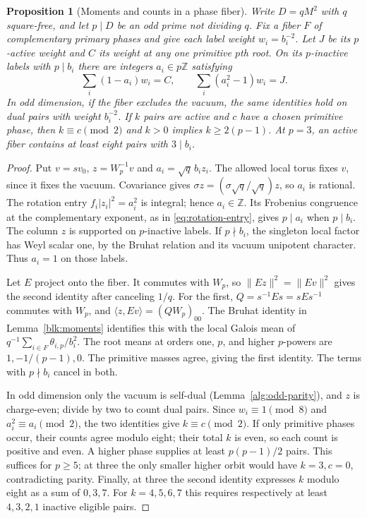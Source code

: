 \documentclass[11pt]{amsart}
\numberwithin{equation}{section}
\newtheorem{proposition}[theorem]{Proposition}
\theoremstyle{definition}
\theoremstyle{plain}
\begin{document}
\begin{proposition}[Moments and counts in a phase fiber]\label{phase:moments}\label{odd:edge-budget}
Write $D=qM^2$ with $q$ square-free, and let $p\mid D$ be an odd
prime not dividing $q$. Fix a fiber $F$ of complementary primary phases and
give each label weight $w_i=b_i^{-2}$. Let $J$ be its $p$-active
weight and $C$ its weight at any one primitive $p$th root.
On its $p$-inactive labels with $p\mid b_i$ there are integers
$a_i\in p\mathbb Z$ satisfying
\[
       \sum_i(1-a_i)w_i=C,\qquad
       \sum_i(a_i^2-1)w_i=J.
\]
In odd dimension, if the fiber excludes the vacuum, the same
identities hold on dual pairs with weight $b_i^{-2}$. If $k$ pairs
are active and $c$ have a chosen primitive phase, then
$k\equiv c\pmod2$ and $k>0$ implies $k\ge2(p-1)$.
At $p=3$, an active fiber contains at least eight pairs with
$3\mid b_i$.
\end{proposition}
\begin{proof}
Put $v=sv_0$, $z=W_p^{-1}v$ and $a_i=\sqrt q\,b_i z_i$.
The allowed local torus fixes $v$, since it fixes the vacuum.
Covariance gives $\sigma z=(\sigma\sqrt q/\sqrt q)z$, so $a_i$
is rational. The rotation entry $f_i|z_i|^2=a_i^2$ is integral;
hence $a_i\in\mathbb Z$. Its Frobenius congruence at the
complementary exponent, as in \eqref{eq:rotation-entry}, gives
$p\mid a_i$ when $p\mid b_i$. The column $z$ is supported on
$p$-inactive labels. If $p\nmid b_i$, the singleton local factor
has Weyl scalar one, by the Bruhat relation and its vacuum
unipotent character. Thus $a_i=1$ on those labels.

Let $E$ project onto the fiber. It commutes with $W_p$, so
$\|Ez\|^2=\|Ev\|^2$ gives the second identity after canceling
$1/q$. For the first, $Q=s^{-1}Es=sEs^{-1}$ commutes with $W_p$,
and $\langle z,Ev\rangle=(QW_p)_{00}$. The Bruhat identity in
Lemma~\ref{blk:moments} identifies this with the local Galois mean
of $q^{-1}\sum_{i\in F}\theta_{i,p}/b_i^2$. The root means at
orders one, $p$, and higher $p$-powers are $1,-1/(p-1),0$.
The primitive masses agree, giving the first identity. The terms
with $p\nmid b_i$ cancel in both.

In odd dimension only the vacuum is self-dual
(Lemma~\ref{alg:odd-parity}), and $z$ is charge-even; divide by two
to count dual pairs. Since
$w_i\equiv1\pmod8$ and $a_i^2\equiv a_i\pmod2$, the two
identities give $k\equiv c\pmod2$. If only primitive phases occur,
their counts agree modulo eight; their total $k$ is even, so each
count is positive and even. A higher phase supplies at least
$p(p-1)/2$ pairs. This suffices for $p\ge5$; at three the only
smaller higher orbit would have $k=3,c=0$, contradicting parity.
Finally, at three the second identity expresses $k$ modulo eight
as a sum of $0,3,7$. For $k=4,5,6,7$ this requires respectively
at least $4,3,2,1$ inactive eligible pairs.
\end{proof}
\end{document}
